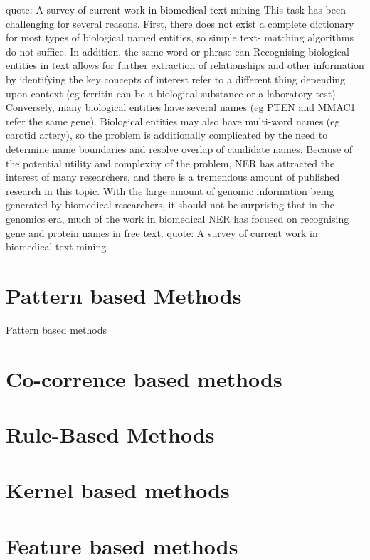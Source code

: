 quote: A survey of current work in biomedical text mining
This task has been challenging for several reasons. First, there does not exist a complete dictionary for most types of biological named entities, so simple text- matching algorithms do not suffice. In addition, the same word or phrase can
Recognising biological entities in text allows for further extraction of relationships and other information by identifying the key concepts of interest
refer to a different thing depending upon context (eg ferritin can be a biological substance or a laboratory test). Conversely, many biological entities have several names (eg PTEN and MMAC1 refer the same gene). Biological entities may also have multi-word names (eg carotid artery), so the problem is additionally complicated by the need to determine name boundaries and resolve overlap of candidate names.
Because of the potential utility and complexity of the problem, NER has attracted the interest of many researchers, and there is a tremendous amount of published research in this topic. With the large amount of genomic information being generated by biomedical researchers, it should not be surprising that in the genomics era, much of the work in biomedical NER has focused on recognising gene and protein names in free text.
quote: A survey of current work in biomedical text mining

\section{Pattern based Methods}
Pattern based methods 
\section{Co-corrence based methods}
\section{Rule-Based Methods}

\section{Kernel based methods} %


\section{Feature based methods}  %
\label{section1.3}

\section{}